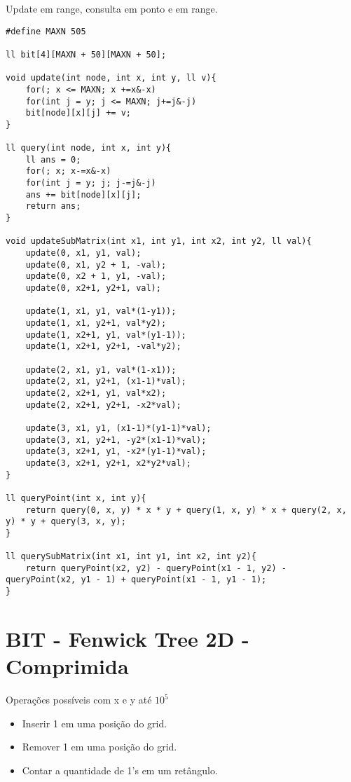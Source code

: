 Update em range, consulta em ponto e em range.
\begin{multicols}{2}
	\begin{lstlisting}
#define MAXN 505

ll bit[4][MAXN + 50][MAXN + 50];

void update(int node, int x, int y, ll v){
	for(; x <= MAXN; x +=x&-x)
	for(int j = y; j <= MAXN; j+=j&-j)
	bit[node][x][j] += v;
}

ll query(int node, int x, int y){
	ll ans = 0;
	for(; x; x-=x&-x)
	for(int j = y; j; j-=j&-j)
	ans += bit[node][x][j];
	return ans;
}

void updateSubMatrix(int x1, int y1, int x2, int y2, ll val){
	update(0, x1, y1, val);
	update(0, x1, y2 + 1, -val);
	update(0, x2 + 1, y1, -val);	
	update(0, x2+1, y2+1, val);
	
	update(1, x1, y1, val*(1-y1));
	update(1, x1, y2+1, val*y2);
	update(1, x2+1, y1, val*(y1-1));
	update(1, x2+1, y2+1, -val*y2);
	
	update(2, x1, y1, val*(1-x1));
	update(2, x1, y2+1, (x1-1)*val);
	update(2, x2+1, y1, val*x2);
	update(2, x2+1, y2+1, -x2*val);
	
	update(3, x1, y1, (x1-1)*(y1-1)*val);
	update(3, x1, y2+1, -y2*(x1-1)*val);
	update(3, x2+1, y1, -x2*(y1-1)*val);
	update(3, x2+1, y2+1, x2*y2*val);
}

ll queryPoint(int x, int y){
	return query(0, x, y) * x * y + query(1, x, y) * x + query(2, x, y) * y + query(3, x, y);
}

ll querySubMatrix(int x1, int y1, int x2, int y2){
	return queryPoint(x2, y2) - queryPoint(x1 - 1, y2) - queryPoint(x2, y1 - 1) + queryPoint(x1 - 1, y1 - 1);
}

\end{lstlisting}
\end{multicols}

\section{BIT - Fenwick Tree 2D - Comprimida}

Operações possíveis com x e y até $10^5$
\begin{itemize}
\itemsep0em
\item Inserir 1 em uma posição do grid.
\item Remover 1 em uma posição do grid.
\item Contar a quantidade de 1's em um retângulo.
\end{itemize}

